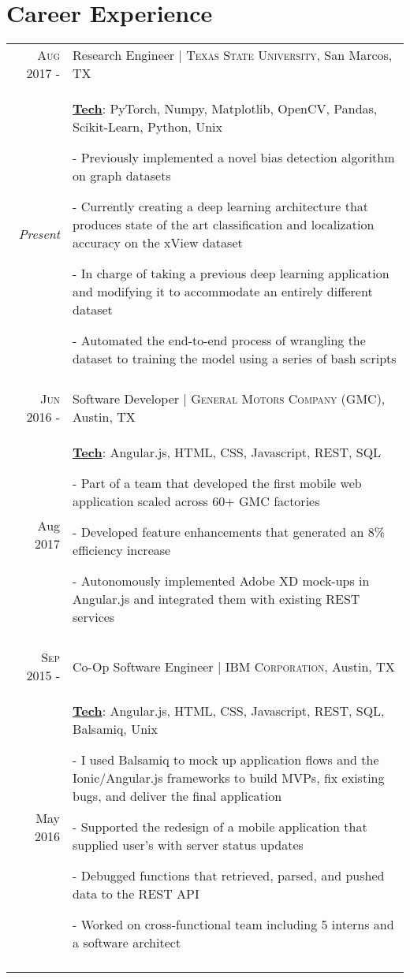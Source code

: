 \documentclass[a4paper,10pt]{article}
\begin{document}
\section{Career Experience}
\begin{tabular}{r|p{12cm}}
\textsc{Aug 2017 -} & Research Engineer | \textsc{Texas State University}, San Marcos, TX \\
\emph{Present} & \small{
	\textbf{\underline{Tech}}: PyTorch, Numpy, Matplotlib, OpenCV, Pandas, Scikit-Learn, Python, Unix
	}

	\tiny{
	\vphantom{a}
	}

	\small{
	- Previously implemented a novel bias detection algorithm on graph datasets	
	
	- Currently creating a deep learning architecture that produces state of the art classification and localization accuracy on the xView dataset
	
	- In charge of taking a previous deep learning application and modifying it to accommodate an entirely different dataset 
	
	- Automated the end-to-end process of wrangling the dataset to training the model using a series of bash scripts
	}
	\\
 \multicolumn{2}{c}{} \\
 
 \textsc{Jun 2016 -} & Software Developer | \textsc{General Motors Company (GMC)}, Austin, TX \\
Aug 2017 & \small{
	\textbf{\underline{Tech}}: Angular.js, HTML, CSS, Javascript, REST, SQL}

	\tiny{
	\vphantom{a}
	}
	
	\small{
	- Part of a team that developed the first mobile web application scaled across 60+ GMC factories 
	
	- Developed feature enhancements that generated an 8\% efficiency increase
	
	- Autonomously implemented Adobe XD mock-ups in Angular.js and integrated them with existing REST services
} \\
 \multicolumn{2}{c}{} \\
 
 \textsc{Sep 2015 -} & Co-Op Software Engineer | \textsc{IBM Corporation}, Austin, TX \\
 May 2016 & \small{
 	\textbf{\underline{Tech}}: Angular.js, HTML, CSS, Javascript, REST, SQL, Balsamiq, Unix}
 
	\tiny{
	\vphantom{a}
	}
	
	\small{
 	- I used Balsamiq to mock up application flows and the Ionic/Angular.js frameworks to build MVPs, fix existing bugs, and deliver the final application
 	
 	- Supported the redesign of a mobile application that supplied user’s with server status updates
 	
 	- Debugged functions that retrieved, parsed, and pushed data to the REST API 
 	
 	- Worked on cross-functional team including 5 interns and a software architect
 } \\
 \multicolumn{2}{c}{} \\
\end{tabular}
\end{document}
